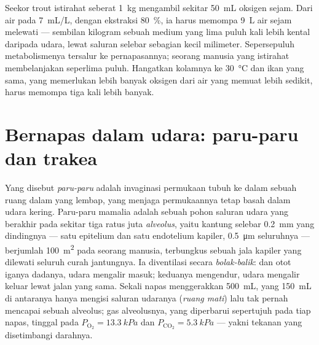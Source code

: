 \begin{example}\label{ex:b1:gas-exchange:priceofwater}
Seekor trout istirahat seberat \qty{1}{kg} mengambil sekitar
\qty{50}{mL} oksigen sejam. Dari air pada \qty{7}{mL/L}, dengan
ekstraksi \qty{80}{\%}, ia harus memompa \qty{9}{L} air sejam melewati
 --- sembilan kilogram sebuah medium yang lima puluh kali
lebih kental daripada udara, lewat saluran selebar sebagian kecil
milimeter. Sepersepuluh metabolismenya tersalur ke pernapasannya;
seorang manusia yang istirahat membelanjakan seperlima puluh. Hangatkan
kolamnya ke \qty{30}{\celsius} dan ikan yang sama, yang memerlukan
lebih banyak oksigen dari air yang memuat lebih sedikit, harus memompa
tiga kali lebih banyak.
\end{example}

\section{Bernapas dalam udara: paru-paru dan trakea}

\begin{definition}\label{def:b1:gas-exchange:lung}
Yang disebut \emph{paru-paru} adalah invaginasi permukaan tubuh ke
dalam sebuah ruang dalam yang lembap, yang menjaga permukaannya tetap
basah dalam udara kering. Paru-paru mamalia adalah sebuah pohon
saluran udara yang berakhir pada sekitar tiga ratus juta
\emph{alveolus}, yaitu kantung selebar \qty{0.2}{mm} yang dindingnya
--- satu  epitelium dan satu endotelium kapiler, \qty{0.5}{\micro m}
seluruhnya --- berjumlah \qty{100}{m^2} pada seorang manusia, terbungkus
sebuah jala kapiler yang dilewati seluruh curah jantungnya. Ia
diventilasi secara \emph{bolak-balik}:  dan otot iganya
 dadanya, udara mengalir masuk; keduanya mengendur, udara
mengalir keluar lewat jalan yang sama. Sekali napas menggerakkan
\qty{500}{mL}, yang \qty{150}{mL} di antaranya hanya mengisi saluran
udaranya (\emph{ruang mati}) lalu tak pernah mencapai sebuah alveolus;
gas alveolusnya, yang diperbarui sepertujuh pada tiap napas, tinggal
pada $P_{\mathrm{O_2}} =
\qty{13.3}{kPa}$ dan $P_{\mathrm{CO_2}} = \qty{5.3}{kPa}$ --- yakni
tekanan yang disetimbangi darahnya.
\end{definition}

